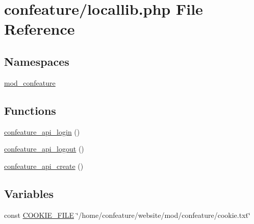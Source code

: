 \hypertarget{locallib_8php}{\section{confeature/locallib.php File Reference}
\label{locallib_8php}
}
\subsection*{Namespaces}
\begin{DoxyCompactItemize}
\item 
\hyperlink{namespacemod__confeature}{mod\-\_\-confeature}
\end{DoxyCompactItemize}
\subsection*{Functions}
\begin{DoxyCompactItemize}
\item 
\hyperlink{locallib_8php_a0034931acefd021a0147a0216bc0a6a8}{confeature\-\_\-api\-\_\-login} ()
\item 
\hyperlink{locallib_8php_a7acfa5bd6b3fa64681a044cfa5360652}{confeature\-\_\-api\-\_\-logout} ()
\item 
\hyperlink{locallib_8php_a7dc79dc02ce145c489edd4734a207278}{confeature\-\_\-api\-\_\-create} ()
\end{DoxyCompactItemize}
\subsection*{Variables}
\begin{DoxyCompactItemize}
\item 
const \hyperlink{locallib_8php_a30f006ca5997500742610df15bccc1a2}{C\-O\-O\-K\-I\-E\-\_\-\-F\-I\-L\-E} \char`\"{}/home/confeature/website/mod/confeature/cookie.\-txt\char`\"{}
\end{DoxyCompactItemize}


